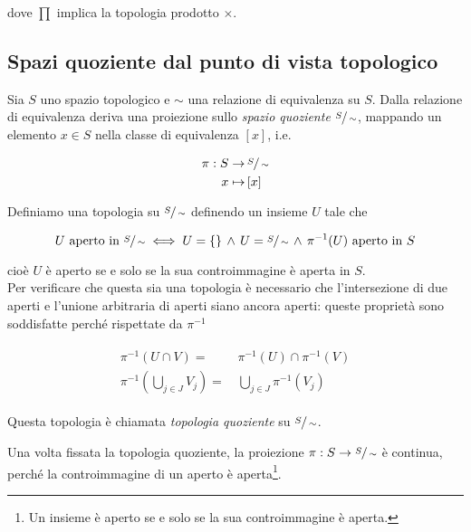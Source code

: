 dove $ \prod $ implica la topologia prodotto $ \times $.

\subsection{Spazi quoziente dal punto di vista topologico}

Sia $ S $ uno spazio topologico e $ \sim $ una relazione di equivalenza su $ S $. Dalla relazione di equivalenza deriva una proiezione sullo \textit{spazio quoziente} $ \sfrac{S}{\sim} $, mappando un elemento $ x \in S $ nella classe di equivalenza $ [x] $, i.e.

\begin{align}
	\begin{split}
		\pi : S \to& \, \sfrac{S}{\sim}\\
		x \mapsto& \, [x]
	\end{split}
\end{align}

Definiamo una topologia su $ \sfrac{S}{\sim} $ definendo un insieme $ U $ tale che

\begin{equation}
	U \text{ aperto in } \sfrac{S}{\sim} \iff U = \{\} \, \wedge \, U = \sfrac{S}{\sim} \, \wedge \, \pi^{-1}(U) \text{ aperto in } S
\end{equation}

cioè $ U $ è aperto se e solo se la sua controimmagine è aperta in $ S $.\\
Per verificare che questa sia una topologia è necessario che l'intersezione di due aperti e l'unione arbitraria di aperti siano ancora aperti: queste proprietà sono soddisfatte perché rispettate da $ \pi^{-1} $

\begin{align}
	\begin{split}
		\pi^{-1}(U \cap V) =& \, \pi^{-1}(U) \cap \pi^{-1}(V)\\
		\pi^{-1}\left( \bigcup_{j \in J} V_{j} \right) =& \, \bigcup_{j \in J} \pi^{-1}(V_{j})
	\end{split}
\end{align}

Questa topologia è chiamata \textit{topologia quoziente} su $ \sfrac{S}{\sim} $.

\begin{remark}
	Una volta fissata la topologia quoziente, la proiezione $ \pi : S \to \sfrac{S}{\sim} $ è continua, perché la controimmagine di un aperto è aperta\footnote{%
		Un insieme è aperto se e solo se la sua controimmagine è aperta.%
	}.
\end{remark}

